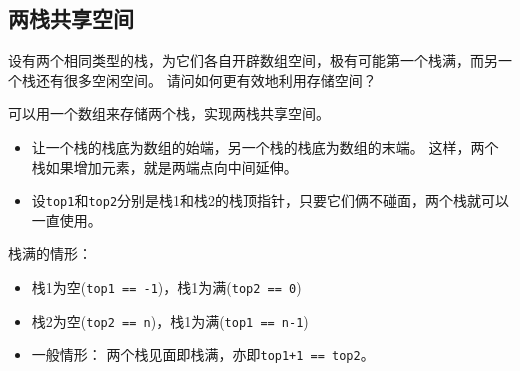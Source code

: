 \subsection{两栈共享空间}

\begin{frame}\ft{\subsecname}
\begin{wenti}
设有两个相同类型的栈，为它们各自开辟数组空间，极有可能第一个栈满，而另一个栈还有很多空闲空间。
请问如何更有效地利用存储空间？
\end{wenti}
\pause
可以用一个数组来存储两个栈，实现两栈共享空间。
\end{frame}
%
%
\begin{frame}\ft{\subsecname}

\end{frame}
%
%
\begin{frame}\ft{\subsecname}
\begin{itemize}
\item   让一个栈的栈底为数组的始端，另一个栈的栈底为数组的末端。
这样，两个栈如果增加元素，就是两端点向中间延伸。 \\
\item 设{\tt top1}和{\tt top2}分别是栈1和栈2的栈顶指针，只要它们俩不碰面，两个栈就可以一直使用。
\end{itemize}
\end{frame}
%
%
\begin{frame}\ft{\subsecname}
栈满的情形：
\begin{itemize}
\item 栈1为空({\tt top1 == -1})，栈1为满({\tt top2 == 0})
\item 栈2为空({\tt top2 == n})，栈1为满({\tt top1 == n-1})
\item 一般情形： 两个栈见面即栈满，亦即{\tt top1+1 == top2}。
\end{itemize}
\end{frame}
%
%
\begin{frame}[fragile]


\end{frame}

\begin{frame}[fragile]


\end{frame}


\begin{frame}[fragile]


\end{frame}
%
%
